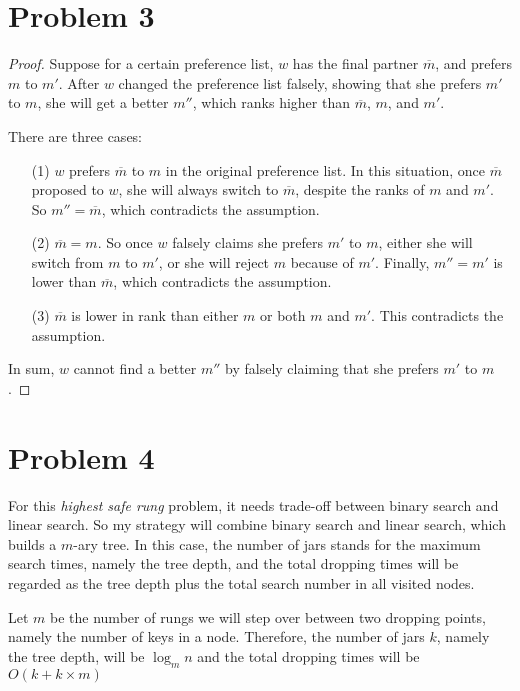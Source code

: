 \documentclass[12pt,letterpaper]{article}
\begin{document}
\section*{Problem 3}
\begin{proof}
Suppose for a certain preference list, $w$ has the final partner $\overline{m}$,
and prefers $m$ to $m'$. After $w$ changed the preference list falsely, 
showing that she prefers $m'$ to $m$, she will get a better $m''$, which 
ranks higher than $\overline{m}$, $m$, and $m'$.

There are three cases:
\begin{itemize}
    \item[(1)] $w$ prefers $\overline{m}$ to $m$ in the original preference 
    list. In this situation, once $\overline{m}$ proposed to $w$, she will always 
    switch to $\overline{m}$, despite the ranks of $m$ and $m'$. So $m'' = 
    \overline{m}$, which contradicts the assumption. 

    \item[(2)] $\overline{m} = m$. So once $w$ falsely claims she prefers $m'$
    to $m$, either she will switch from $m$ to $m'$, or she will reject $m$ 
    because of $m'$. Finally, $m'' = m'$ is lower than $\overline{m}$, which
    contradicts the assumption.

    \item[(3)] $\overline{m}$ is lower in rank than either $m$ or both $m$ and
    $m'$. This contradicts the assumption.
\end{itemize}

In sum, $w$ cannot find a better $m''$ by falsely claiming that she prefers 
$m'$ to $m$.
\end{proof}

\section*{Problem 4}
For this \textit{highest safe rung} problem, it needs trade-off between binary
search and linear search. So my strategy will combine binary search and linear
search, which builds a $m$-ary tree. In this case, the number of jars stands 
for the maximum search times, namely the tree depth, and the total dropping 
times will be regarded as the tree depth plus the total search number in all 
visited nodes. 
 
Let $m$ be the number of rungs we will step over between two dropping points,
namely the number of keys in a node. Therefore, the number of jars $k$, 
namely the tree depth, will be $\log_{m}n$ and the total dropping times will 
be $O(k + k \times m)$
\end{document}
